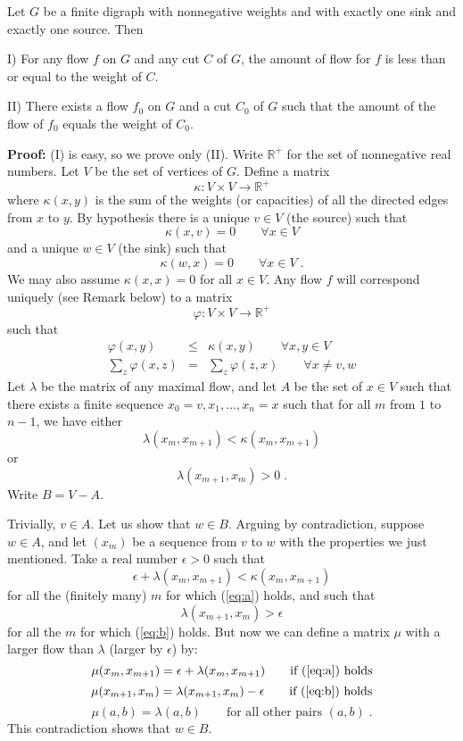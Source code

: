 \documentclass[12pt]{article}
\newcommand{\R}{\mathbb R^+}
\begin{document}
Let $G$ be a finite digraph with nonnegative weights and with
exactly one sink and exactly one source. Then

I) For any flow $f$ on $G$ and any cut $C$ of $G$, the amount
of flow for $f$ is less than or equal to the weight of $C$.

II) There exists a flow $f_0$ on $G$ and a cut $C_0$ of $G$
such that the amount of the flow of $f_0$ equals the weight of $C_0$.

\textbf{Proof: }(I) is easy, so we prove only (II).
Write $\R$ for the set of nonnegative real numbers.
Let $V$ be the set of vertices of $G$.
Define a matrix
$$\kappa:V\times V\to\R$$
where $\kappa(x,y)$ is the sum of the weights (or capacities) of
all the directed edges from $x$ to $y$.
By hypothesis there is a unique $v\in V$ (the source) such that
$$\kappa(x,v)=0\qquad\forall x\in V$$
and a unique $w\in V$ (the sink) such that
$$\kappa(w,x)=0\qquad\forall x\in V\;.$$
We may also assume $\kappa(x,x)=0$ for all $x\in V$.
Any flow $f$ will correspond uniquely (see Remark below) to a matrix
$$\varphi:V\times V\to\R$$
such that
\begin{eqnarray*}
\varphi(x,y)&\le&\kappa(x,y)\qquad\forall x,y\in V \\
\sum_z\varphi(x,z)&=&\sum_z\varphi(z,x)\qquad\forall x\ne v,w
\end{eqnarray*}
Let $\lambda$ be the matrix of any maximal flow, and let $A$
be the set of $x\in V$ such that there exists a finite sequence
$x_0=v,x_1,\ldots,x_n=x$
such that for all $m$ from $1$ to $n-1$, we have either
\begin{equation} \label{eq:a}
\lambda(x_m,x_{m+1})<\kappa(x_m,x_{m+1})
\end{equation}
or
\begin{equation} \label{eq:b}
\lambda(x_{m+1},x_m)>0\;.
\end{equation}
Write $B=V-A$.

Trivially, $v\in A$.
Let us show that $w\in B$.
Arguing by contradiction, suppose $w\in A$, and let $(x_m)$ be
a sequence from $v$ to $w$ with the properties we just mentioned.
Take a real number $\epsilon>0$ such that
$$\epsilon+ \lambda(x_m,x_{m+1})<\kappa(x_m,x_{m+1})$$
for all the (finitely many) $m$ for which (\ref{eq:a}) holds, and such
that
$$\lambda(x_{m+1},x_m)>\epsilon$$
for all the $m$ for which (\ref{eq:b}) holds.
But now we can define a matrix $\mu$ with a larger flow
than $\lambda$ (larger by $\epsilon$) by:
$$\mu(x_m,x_{m+1})=\epsilon+\lambda(x_m,x_{m+1})
\qquad\text{if (\ref{eq:a}) holds}$$
$$\mu(x_{m+1},x_m)=\lambda(x_{m+1},x_m)-\epsilon
\qquad\text{if (\ref{eq:b}) holds}$$
$$\mu(a,b)=\lambda(a,b)
\qquad\text{for all other pairs }(a,b)\;.$$
This contradiction shows that $w\in B$.
\end{document}
